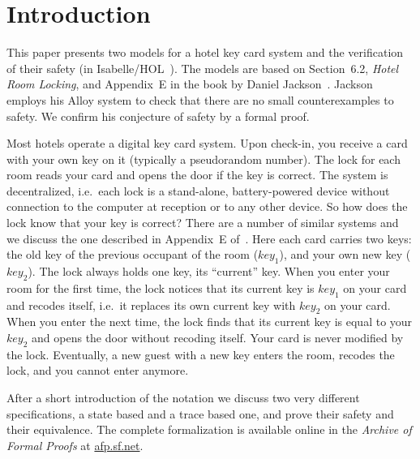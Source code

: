 \section{Introduction}

This paper presents two models for a hotel key card system and the
verification of their safety (in Isabelle/HOL~\cite{LNCS2283}). The
models are based on Section~6.2, \emph{Hotel Room Locking}, and
Appendix~E in the book by Daniel Jackson~\cite{Jackson06}. Jackson
employs his Alloy system to check that there are no small
counterexamples to safety. We confirm his conjecture of safety by a
formal proof.

Most hotels operate a digital key card system. Upon check-in, you
receive a card with your own key on it (typically a pseudorandom
number). The lock for each room reads your card and opens the door if
the key is correct. The system is decentralized,
i.e.\ each lock is a stand-alone, battery-powered device without
connection to the computer at reception or to any other device. So
how does the lock know that your key is correct? There are a number of
similar systems and we discuss the one described in Appendix~E
of~\cite{Jackson06}. Here each card carries two keys: the old key of
the previous occupant of the room ($key_1$), and your own new key
($key_2$). The lock always holds one key, its ``current'' key. When
you enter your room for the first time, the lock notices that its
current key is $key_1$ on your card and recodes itself, i.e.\ it replaces
its own current key with $key_2$ on your card. When you enter the next
time, the lock finds that its current key is equal to your $key_2$ and
opens the door without recoding itself. Your card is never modified by
the lock. Eventually, a new guest with a new key enters the room,
recodes the lock, and you cannot enter anymore.

After a short introduction of the notation we discuss two very
different specifications, a state based and a trace based one, and
prove their safety and their equivalence. The complete formalization
is available online in the \emph{Archive of Formal Proofs} at
\url{afp.sf.net}.

